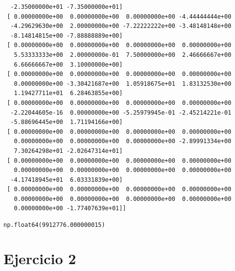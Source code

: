 \documentclass[
  letterpaper,
  DIV=11,
  numbers=noendperiod]{scrartcl}
\begin{document}
\begin{verbatim}
  -2.35000000e+01 -7.35000000e+01]
 [ 0.00000000e+00  0.00000000e+00  0.00000000e+00 -4.44444444e+00
  -4.29629630e+00  2.00000000e+00 -7.22222222e+00 -3.48148148e+00
  -8.14814815e+00 -7.88888889e+00]
 [ 0.00000000e+00  0.00000000e+00  0.00000000e+00  0.00000000e+00
   5.53333333e+00  2.00000000e-01  7.50000000e+00  2.46666667e+00
   6.66666667e+00  3.10000000e+00]
 [ 0.00000000e+00  0.00000000e+00  0.00000000e+00  0.00000000e+00
   0.00000000e+00 -3.30421687e+00  1.05918675e+01  1.83132530e+00
   1.19427711e+01  6.28463855e+00]
 [ 0.00000000e+00  0.00000000e+00  0.00000000e+00  0.00000000e+00
  -2.22044605e-16  0.00000000e+00 -5.25979945e-01 -2.45214221e-01
  -5.88696445e+00  1.71194166e+00]
 [ 0.00000000e+00  0.00000000e+00  0.00000000e+00  0.00000000e+00
   0.00000000e+00  0.00000000e+00  0.00000000e+00 -2.89991334e+00
   7.30264298e+01 -2.02647314e+01]
 [ 0.00000000e+00  0.00000000e+00  0.00000000e+00  0.00000000e+00
   0.00000000e+00  0.00000000e+00  0.00000000e+00  0.00000000e+00
  -4.17418945e+01  6.03331839e+00]
 [ 0.00000000e+00  0.00000000e+00  0.00000000e+00  0.00000000e+00
   0.00000000e+00  0.00000000e+00  0.00000000e+00  0.00000000e+00
   0.00000000e+00 -1.77407639e+01]]
\end{verbatim}

\begin{verbatim}
np.float64(9912776.000000015)
\end{verbatim}

\section{Ejercicio 2}\label{ejercicio-2}
\end{document}
